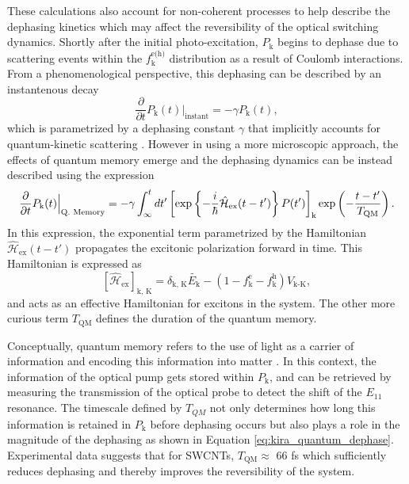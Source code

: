 These calculations also account for non-coherent processes to help describe the dephasing kinetics which may affect the reversibility of the optical switching dynamics. Shortly after the initial photo-excitation, $P_\text{k}$ begins to dephase due to scattering events within the $f_\text{k}^\text{e(h)}$ distribution as a result of Coulomb interactions. From a phenomenological perspective, this dephasing can be described by an instantenous decay
\begin{equation}
	\dfrac{\partial}{\partial t} P_\text{k}(t) \Big|_\text{instant} = -\gamma P_\text{k}(t),
\end{equation}
which is parametrized by a dephasing constant $\gamma$ that implicitly accounts for quantum-kinetic scattering \cite{smith2010extraction, kira2011semiconductor}. However in using a more microscopic approach, the effects of quantum memory emerge and the dephasing dynamics can be instead described using the expression
%
\begin{equation}\label{eq:kira_phenom_dephase}
	\dfrac{\partial}{\partial t} P_\text{k}(t) \Big|_\text{Q. Memory} = -\gamma \int^{t}_{\infty} dt' \left[ \exp\left\{ - \frac{\small i}{ \small \hbar} \hat{\mathcal{H}}_\text{ex}(t-t') \right\} P(t') \right]_\text{k} \exp \left(- \frac{t-t'}{T_\text{QM}} \right).
\end{equation}
%
In this expression, the exponential term parametrized by the Hamiltonian $\hat{\mathcal{H}}_\text{ex}(t-t')$ propagates the excitonic polarization forward in time. This Hamiltonian is expressed as
%
\begin{equation}
	\left[ \hat{\mathcal{H}}_\text{ex} \right]_\text{k, K}= \delta_\text{k, K} \tilde{E_\text{k}} - (1 - f_\text{k}^\text{e} - f_\text{k}^\text{h}) V_\text{k-K},
  \label{eq:kira_quantum_dephase}
\end{equation}
%
and acts as an effective Hamiltonian for excitons in the system. The other more curious term $T_\text{QM}$ defines the duration of the quantum memory.

Conceptually, quantum memory refers to the use of light as a carrier of information and encoding this information into matter \cite{iakoupov2013efficient}. In this context, the information of the optical pump gets stored within $P_\text{k}$, and can be retrieved by measuring the transmission of the optical probe to detect the shift of the $E_{11}$ resonance. The timescale defined by $T_{QM}$ not only determines how long this information is retained in $P_\text{k}$ before dephasing occurs but also plays a role in the magnitude of the dephasing as shown in Equation \eqref{eq:kira_quantum_dephase}. Experimental data suggests that for SWCNTs, $T_\text{QM} \approx $ 66 fs which sufficiently reduces dephasing and thereby improves the reversibility of the system.

